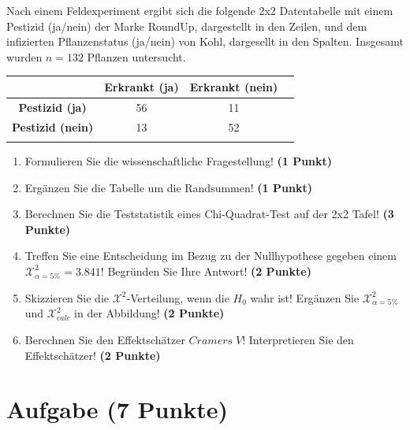 \documentclass[a4paper, 9pt]{scrartcl}\usepackage[]{graphicx}\usepackage[]{xcolor}
\begin{document}
Nach einem Feldexperiment ergibt sich die folgende 2x2 Datentabelle mit einem
Pestizid (ja/nein) der Marke RoundUp, dargestellt in den Zeilen, und
dem infizierten Pflanzenstatus (ja/nein) von Kohl, dargesellt in
den Spalten. Insgesamt wurden $n = 132$ Pflanzen untersucht.
\vspace{5Ex}

\begin{center}
  \Large
  \begin{tabular}{c|c|c|c}
     & \textbf{Erkrankt (ja)} & \textbf{Erkrankt (nein)} &  \strut\\
    \hline
    \textbf{Pestizid (ja)} & 56  & 11  &     \strut\\
    \hline
    \textbf{Pestizid (nein)} & 13  & 52  &      \strut\\
    \hline
     \phantom{100} & \phantom{100}  & \phantom{100}  &  \phantom{100}  \strut\\
  \end{tabular}
\end{center}

\vspace{5Ex}

\begin{enumerate}
\item Formulieren Sie die wissenschaftliche Fragestellung! \textbf{(1 Punkt)}
\item Erg{\"a}nzen Sie die Tabelle um die Randsummen! \textbf{(1 Punkt)} 
\item Berechnen Sie die Teststatistik eines Chi-Quadrat-Test auf der 2x2
  Tafel! \textbf{(3 Punkte)}
\item Treffen Sie eine Entscheidung im Bezug zu der Nullhypothese gegeben
  einem $\mathcal{X}^2_{\alpha = 5\%} = 3.841$! Begr{\"u}nden Sie Ihre Antwort!
  \textbf{(2 Punkte)}
\item Skizzieren Sie die $\mathcal{X}^2$-Verteilung, wenn die $H_0$ wahr
  ist! Erg{\"a}nzen Sie  $\mathcal{X}^2_{\alpha = 5\%}$ und
  $\mathcal{X}^2_{calc}$ in der Abbildung! \textbf{(2 Punkte)}
\item Berechnen Sie den Effektsch{\"a}tzer $Cramers\; V$! Interpretieren Sie den
  Effektsch{\"a}tzer! \textbf{(2 Punkte)}
\end{enumerate} 
\clearpage

\section{Aufgabe \hfill (7 Punkte)}
\end{document}
